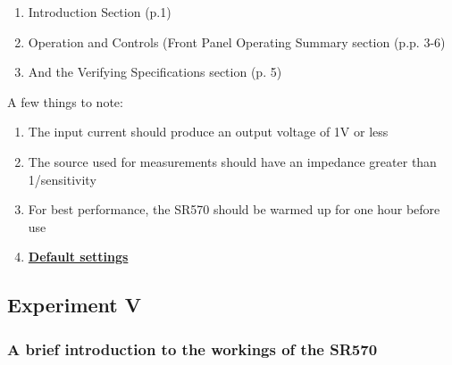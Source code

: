 \documentclass{../lab}
\begin{document}
\begin{enumerate}
    \item Introduction Section (p.1)

    \item Operation and Controls (Front Panel Operating Summary section (p.p. 3-6)

    \item And the Verifying Specifications section (p. 5)

\end{enumerate}

\noindent A few things to note:

\begin{enumerate}
    \item The input current should produce an output voltage of 1V or less

    \item The source used for measurements should have an impedance greater than 1/sensitivity

    \item For best performance, the SR570 should be warmed up for one hour before use

    \item \href{https://berkeley-physics111b.github.io/appendices/defaultsettings/}{\textbf{Default settings}}

\end{enumerate}

\subsection{Experiment V}

\subsubsection{A brief introduction to the workings of the SR570}
\end{document}
